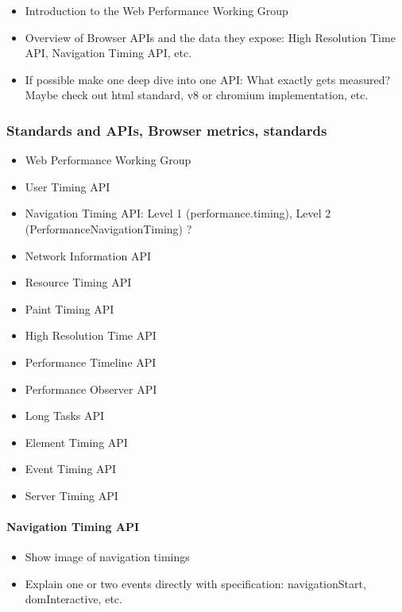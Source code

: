 \begin{itemize}
\item Introduction to the Web Performance Working Group
\item Overview of Browser APIs and the data they expose: High Resolution Time API, Navigation Timing API, etc.
\item If possible make one deep dive into one API: What exactly gets measured? Maybe check out html standard, v8 or chromium implementation, etc.
\end{itemize}



\subsubsection{Standards and APIs, Browser metrics, standards}




\begin{itemize}
		\item Web Performance Working Group
		\item User Timing API
		\item Navigation Timing API: Level 1 (performance.timing), Level 2 (PerformanceNavigationTiming) ?
		\item Network Information API
		\item Resource Timing API
		\item Paint Timing API
		\item High Resolution Time API
		\item Performance Timeline API
		\item Performance Observer API
		\item Long Tasks API
		\item Element Timing API
		\item Event Timing API
		\item Server Timing API
\end{itemize}



\paragraph{Navigation Timing API}

\begin{itemize}
\item Show image of navigation timings
\item Explain one or two events directly with specification: navigationStart, domInteractive, etc.
\end{itemize}

